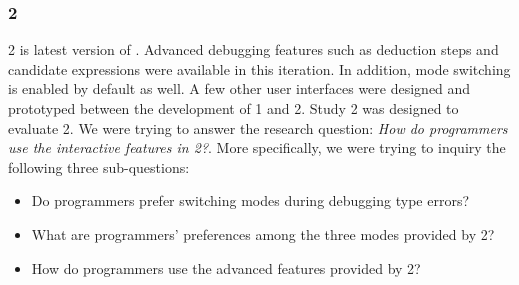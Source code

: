   







\subsubsection{\textbf{\chameleon{} 2}}  \label{sub:us4}

\chameleon{} 2 is latest version of \chameleon{}. Advanced debugging features such as deduction steps and candidate expressions were available in this iteration. In addition, mode switching is enabled by default as well. A few other user interfaces were designed and prototyped between the development of \chameleon{} 1 and \chameleon{} 2. Study 2 was designed to evaluate \chameleon{} 2.  We were trying to answer the research question: \textit{How do programmers use the interactive features in \chameleon{} 2?}. More specifically, we were trying to inquiry the following three sub-questions:
\begin{itemize}
    \item Do programmers prefer switching modes during debugging type errors?
    \item What are programmers' preferences among the three modes provided by \chameleon{} 2?
    \item How do programmers use the advanced features provided by \chameleon{} 2?

\end{itemize}

